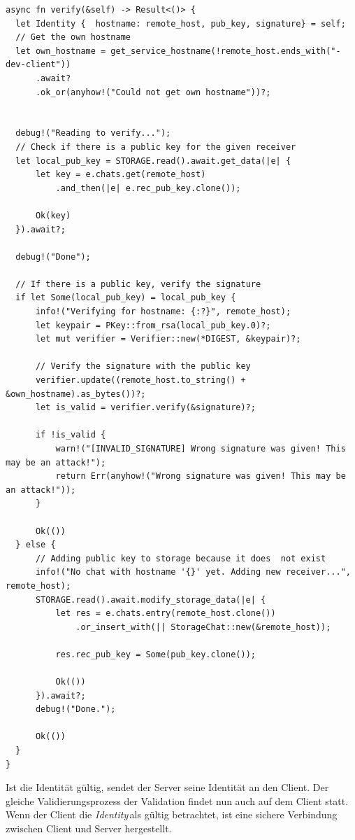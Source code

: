 \documentclass[a4paper,ngerman, headheight=28pt,12pt]{scrartcl}
\newcommand{\identity}{\textit{Identity\,}}
\begin{document}
\begin{verbatim}
async fn verify(&self) -> Result<()> {
  let Identity {  hostname: remote_host, pub_key, signature} = self;
  // Get the own hostname
  let own_hostname = get_service_hostname(!remote_host.ends_with("-dev-client"))
      .await?
      .ok_or(anyhow!("Could not get own hostname"))?;


  debug!("Reading to verify...");
  // Check if there is a public key for the given receiver
  let local_pub_key = STORAGE.read().await.get_data(|e| {
      let key = e.chats.get(remote_host)
          .and_then(|e| e.rec_pub_key.clone());

      Ok(key)
  }).await?;

  debug!("Done");

  // If there is a public key, verify the signature
  if let Some(local_pub_key) = local_pub_key {
      info!("Verifying for hostname: {:?}", remote_host);
      let keypair = PKey::from_rsa(local_pub_key.0)?;
      let mut verifier = Verifier::new(*DIGEST, &keypair)?;

      // Verify the signature with the public key
      verifier.update((remote_host.to_string() + &own_hostname).as_bytes())?;
      let is_valid = verifier.verify(&signature)?;

      if !is_valid {
          warn!("[INVALID_SIGNATURE] Wrong signature was given! This may be an attack!");
          return Err(anyhow!("Wrong signature was given! This may be an attack!"));
      }

      Ok(())
  } else {
      // Adding public key to storage because it does  not exist
      info!("No chat with hostname '{}' yet. Adding new receiver...", remote_host);
      STORAGE.read().await.modify_storage_data(|e| {
          let res = e.chats.entry(remote_host.clone())
              .or_insert_with(|| StorageChat::new(&remote_host));

          res.rec_pub_key = Some(pub_key.clone());

          Ok(())
      }).await?;
      debug!("Done.");

      Ok(())
  }
}
\end{verbatim}
Ist die Identität gültig, sendet der Server seine Identität an den Client. Der gleiche Validierungsprozess der Validation findet nun auch auf dem Client statt. Wenn der Client die \identity als gültig betrachtet, ist eine sichere Verbindung zwischen Client und Server hergestellt.
\end{document}
